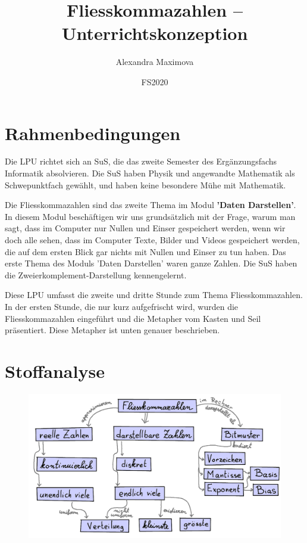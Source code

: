 \documentclass{article}
\title{Fliesskommazahlen -- Unterrichtskonzeption}
\author{Alexandra Maximova}
\date{FS2020}
\begin{document}
\maketitle


\section*{Rahmenbedingungen}
Die LPU richtet sich an SuS, die das zweite Semester des Ergänzungsfachs Informatik absolvieren. Die SuS haben Physik und angewandte Mathematik als Schwepunktfach gewählt, und haben keine besondere Mühe mit Mathematik.

Die Fliesskommazahlen sind das zweite Thema im Modul \textbf{'Daten Darstellen'}. In diesem Modul beschäftigen wir uns grundsätzlich mit der Frage, warum man sagt, dass im Computer nur Nullen und Einser gespeichert werden, wenn wir doch alle sehen, dass im Computer Texte, Bilder und Videos gespeichert werden, die auf dem ersten Blick gar nichts mit Nullen und Einser zu tun haben. Das erste Thema des Moduls 'Daten Darstellen' waren ganze Zahlen. Die SuS haben die Zweierkomplement-Darstellung kennengelernt.

Diese LPU umfasst die zweite und dritte Stunde zum Thema Fliesskommazahlen. In der ersten Stunde, die nur kurz aufgefrischt wird, wurden die Fliesskommazahlen eingeführt und die Metapher  vom Kasten und Seil präsentiert. Diese Metapher ist unten genauer beschrieben.

\section*{Stoffanalyse}
\begin{figure}[H]
\centering
\includegraphics[width=\textwidth]{Pictures/Fliesskommazahlen_Concept_Map.png} 
\end{figure}
\end{document}
